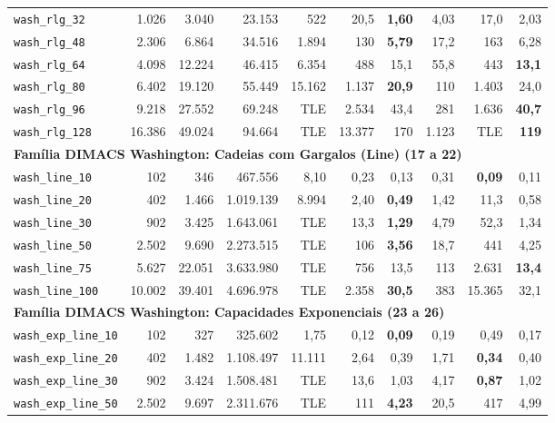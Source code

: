\begin{longtable}{lrrrrrrrrr}
\texttt{wash\_rlg\_32} & 1.026 & 3.040 & 23.153 & 522 & 20,5 & \textbf{1,60} & 4,03 & 17,0 & 2,03 \\
\texttt{wash\_rlg\_48} & 2.306 & 6.864 & 34.516 & 1.894 & 130 & \textbf{5,79} & 17,2 & 163 & 6,28 \\
\texttt{wash\_rlg\_64} & 4.098 & 12.224 & 46.415 & 6.354 & 488 & 15,1 & 55,8 & 443 & \textbf{13,1} \\
\texttt{wash\_rlg\_80} & 6.402 & 19.120 & 55.449 & 15.162 & 1.137 & \textbf{20,9} & 110 & 1.403 & 24,0 \\
\texttt{wash\_rlg\_96} & 9.218 & 27.552 & 69.248 & TLE & 2.534 & 43,4 & 281 & 1.636 & \textbf{40,7} \\
\texttt{wash\_rlg\_128} & 16.386 & 49.024 & 94.664 & TLE & 13.377 & 170 & 1.123 & TLE & \textbf{119} \\
\midrule
\multicolumn{10}{l}{\textbf{Família DIMACS Washington: Cadeias com Gargalos (Line) (17 a 22)}} \\
\midrule
\texttt{wash\_line\_10} & 102 & 346 & 467.556 & 8,10 & 0,23 & 0,13 & 0,31 & \textbf{0,09} & 0,11 \\
\texttt{wash\_line\_20} & 402 & 1.466 & 1.019.139 & 8.994 & 2,40 & \textbf{0,49} & 1,42 & 11,3 & 0,58 \\
\texttt{wash\_line\_30} & 902 & 3.425 & 1.643.061 & TLE & 13,3 & \textbf{1,29} & 4,79 & 52,3 & 1,34 \\
\texttt{wash\_line\_50} & 2.502 & 9.690 & 2.273.515 & TLE & 106 & \textbf{3,56} & 18,7 & 441 & 4,25 \\
\texttt{wash\_line\_75} & 5.627 & 22.051 & 3.633.980 & TLE & 756 & 13,5 & 113 & 2.631 & \textbf{13,4} \\
\texttt{wash\_line\_100} & 10.002 & 39.401 & 4.696.978 & TLE & 2.358 & \textbf{30,5} & 383 & 15.365 & 32,1 \\
\midrule
\multicolumn{10}{l}{\textbf{Família DIMACS Washington: Capacidades Exponenciais (23 a 26)}} \\
\midrule
\texttt{wash\_exp\_line\_10} & 102 & 327 & 325.602 & 1,75 & 0,12 & \textbf{0,09} & 0,19 & 0,49 & 0,17 \\
\texttt{wash\_exp\_line\_20} & 402 & 1.482 & 1.108.497 & 11.111 & 2,64 & 0,39 & 1,71 & \textbf{0,34} & 0,40 \\
\texttt{wash\_exp\_line\_30} & 902 & 3.424 & 1.508.481 & TLE & 13,6 & 1,03 & 4,17 & \textbf{0,87} & 1,02 \\
\texttt{wash\_exp\_line\_50} & 2.502 & 9.697 & 2.311.676 & TLE & 111 & \textbf{4,23} & 20,5 & 417 & 4,99 \\

\end{longtable}
